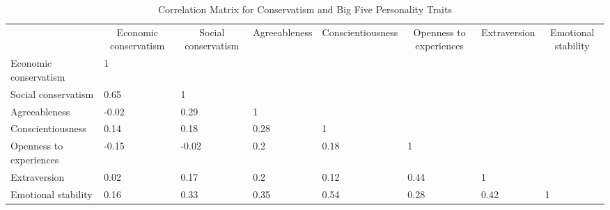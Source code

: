 \documentclass[man]{apa6}
\makeatletter
\newenvironment{lltable}{\begin{landscape}\begin{center}\begin{ThreePartTable}}{\end{ThreePartTable}\end{center}\end{landscape}}
\newcommand\LastLTentrywidth{1em}
\newlength\longtablewidth
\newcommand{\getlongtablewidth}{\begingroup \ifcsname LT@\roman{LT@tables}\endcsname \global\longtablewidth=0pt \renewcommand{\LT@entry}[2]{\global\advance\longtablewidth by ##2\relax\gdef\LastLTentrywidth{##2}}\@nameuse{LT@\roman{LT@tables}} \fi \endgroup}
\makeatother
\begin{document}
\begin{lltable}


\tiny{
\begin{longtable}{llllllll}\noalign{\getlongtablewidth\global\LTcapwidth=\longtablewidth}
\caption{\label{tab:correlations}Correlation Matrix for Conservatism and Big Five Personality Traits}\\
\toprule
 & \multicolumn{1}{c}{Economic conservatism} & \multicolumn{1}{c}{Social conservatism} & \multicolumn{1}{c}{Agreeableness} & \multicolumn{1}{c}{Conscientiousness} & \multicolumn{1}{c}{Openness to experiences} & \multicolumn{1}{c}{Extraversion} & \multicolumn{1}{c}{Emotional stability}\\
\midrule
Economic conservatism & 1 &  &  &  &  &  & \\
Social conservatism & 0.65 & 1 &  &  &  &  & \\
Agreeableness & -0.02 & 0.29 & 1 &  &  &  & \\
Conscientiousness & 0.14 & 0.18 & 0.28 & 1 &  &  & \\
Openness to experiences & -0.15 & -0.02 & 0.2 & 0.18 & 1 &  & \\
Extraversion & 0.02 & 0.17 & 0.2 & 0.12 & 0.44 & 1 & \\
Emotional stability & 0.16 & 0.33 & 0.35 & 0.54 & 0.28 & 0.42 & 1\\
\bottomrule
\end{longtable}
}
\end{lltable}
\end{document}
